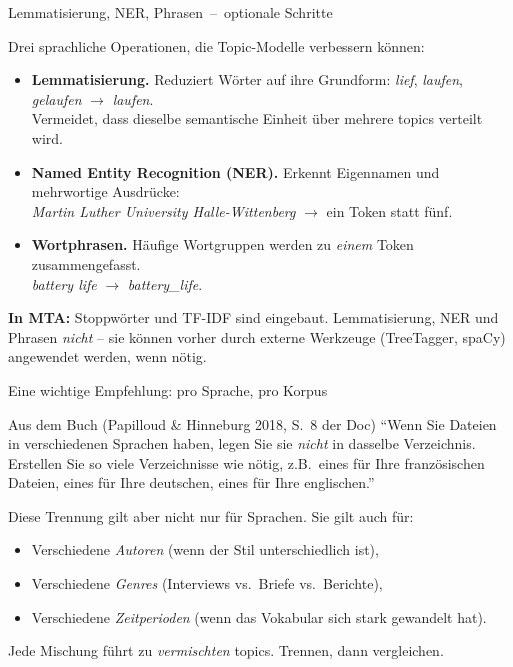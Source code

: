\documentclass[aspectratio=169,11pt]{beamer}
\newcommand{\mdash}{\,{\monodash–}\,}
\let\oldemph\emph
\renewcommand{\emph}[1]{{\color{solCyan}\oldemph{#1}}}
\let\oldtextbf\textbf
\renewcommand{\textbf}[1]{{\color{solBase3}\oldtextbf{#1}}}
\begin{document}
\begin{frame}{Lemmatisierung, NER, Phrasen \mdash{} optionale Schritte}

  Drei sprachliche Operationen, die Topic-Modelle verbessern können:

  \vfill
  \begin{itemize}
    \item \textbf{Lemmatisierung.} Reduziert Wörter auf ihre Grundform:
          \emph{lief}, \emph{laufen}, \emph{gelaufen} $\rightarrow$ \emph{laufen}.
          \\[2pt]
          Vermeidet, dass dieselbe semantische Einheit über mehrere
          topics verteilt wird.
    \vfill
    \item \textbf{Named Entity Recognition (NER).} Erkennt
          Eigennamen und mehrwortige Ausdrücke:
          \\[2pt]
          \emph{Martin Luther University Halle-Wittenberg}
          $\rightarrow$ ein Token statt fünf.
    \vfill
    \item \textbf{Wortphrasen.} Häufige Wortgruppen werden zu
          \emph{einem} Token zusammengefasst.
          \\[2pt]
          \emph{battery life} $\rightarrow$ \emph{battery\_life}.
  \end{itemize}

  \vfill
  \textbf{In MTA:} Stoppwörter und TF-IDF sind eingebaut.
  Lemmatisierung, NER und Phrasen \emph{nicht} – sie können vorher
  durch externe Werkzeuge (TreeTagger, spaCy) angewendet werden,
  wenn nötig.

\end{frame}

\begin{frame}{Eine wichtige Empfehlung: pro Sprache, pro Korpus}

  \begin{block}{Aus dem Buch (Papilloud \& Hinneburg 2018, S.~8 der Doc)}
    \enquote{Wenn Sie Dateien in verschiedenen Sprachen haben, legen
    Sie sie \emph{nicht} in dasselbe Verzeichnis. Erstellen Sie
    so viele Verzeichnisse wie nötig, z.B.\ eines für Ihre
    französischen Dateien, eines für Ihre deutschen, eines für
    Ihre englischen.}
  \end{block}

  \vfill
  Diese Trennung gilt aber nicht nur für Sprachen. Sie gilt auch für:
  \begin{itemize}
    \item Verschiedene \emph{Autoren} (wenn der Stil unterschiedlich ist),
    \vfill
    \item Verschiedene \emph{Genres} (Interviews vs.\ Briefe vs.\ Berichte),
    \vfill
    \item Verschiedene \emph{Zeitperioden} (wenn das Vokabular sich
          stark gewandelt hat).
  \end{itemize}

  \vfill
  Jede Mischung führt zu \emph{vermischten} topics. Trennen, dann
  vergleichen.

\end{frame}
\end{document}
